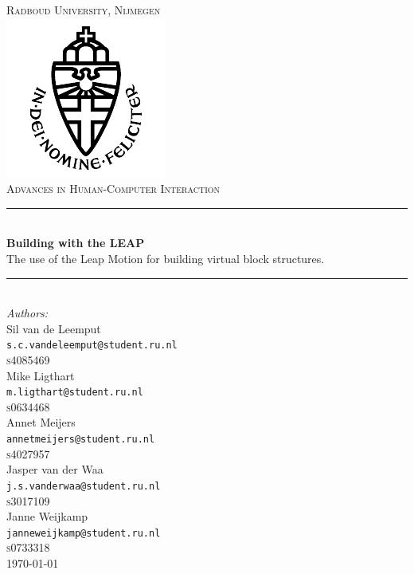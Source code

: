 \newcommand{\HRule}{\rule{\linewidth}{0.5mm}}

\begin{titlepage}

\begin{center}



\textsc{\LARGE Radboud University, Nijmegen}\\

\includegraphics[scale=0.8]{imgs/rulogo.png}\\[1cm]

\textsc{\Large Advances in Human-Computer Interaction}\\[0.5cm]



\HRule \\[0.4cm]
{ \huge \bfseries Building with the LEAP}\\[0.3cm]
{\Large The use of the Leap Motion for building virtual block structures.}

\HRule \\[1cm]

{\large \emph{Authors:}\\[0.2cm]
Sil van de Leemput\\
\texttt{s.c.vandeleemput@student.ru.nl}\\[0.08cm]
\textsc{s4085469}\\[0.5cm]
Mike Ligthart\\
\texttt{m.ligthart@student.ru.nl}\\[0.08cm]
\textsc{s0634468}\\[0.5cm]
Annet Meijers\\
\texttt{annetmeijers@student.ru.nl}\\[0.08cm]
\textsc{s4027957}\\[0.5cm]
Jasper van der Waa\\
\texttt{j.s.vanderwaa@student.ru.nl}\\[0.08cm]
\textsc{s3017109}\\[0.5cm]
Janne Weijkamp\\
\texttt{janneweijkamp@student.ru.nl}\\[0.08cm]
\textsc{s0733318}}\\[2cm]
\today
\end{center}

\end{titlepage}